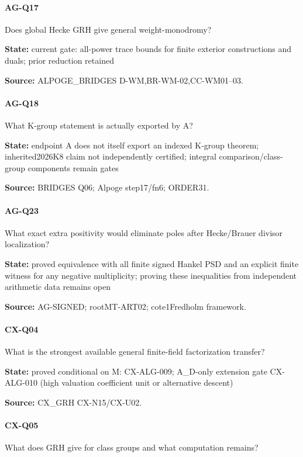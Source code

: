 \documentclass[11pt,a4paper]{article}
\begin{document}
\paragraph{AG-Q17} Does global Hecke GRH give general weight-monodromy?

\textbf{State:} current gate:\allowbreak{} all-power trace bounds for finite exterior constructions and duals; prior reduction retained

\textbf{Source:} ALPOGE\_\allowbreak{}BRIDGES D-WM,BR-WM-02,CC-WM01–\allowbreak{}03.

\paragraph{AG-Q18} What K-group statement is actually exported by A?

\textbf{State:} endpoint A does not itself export an indexed K-group theorem; inherited2026K8 claim not independently certified; integral comparison/\allowbreak{}class-group components remain gates

\textbf{Source:} BRIDGES Q06; Alpoge step17/\allowbreak{}fn6; ORDER31.

\paragraph{AG-Q23} What exact extra positivity would eliminate poles after Hecke/\allowbreak{}Brauer divisor localization?

\textbf{State:} proved equivalence with all finite signed Hankel PSD and an explicit finite witness for any negative multiplicity; proving these inequalities from independent arithmetic data remains open

\textbf{Source:} AG-SIGNED; rootMT-ART02; cote1Fredholm framework.

\paragraph{CX-Q04} What is the strongest available general finite-field factorization transfer?

\textbf{State:} proved conditional on M:\allowbreak{} CX-ALG-009; A\_\allowbreak{}D-only extension gate CX-ALG-010 (high valuation coefficient unit or alternative descent)

\textbf{Source:} CX\_\allowbreak{}GRH CX-N15/\allowbreak{}CX-U02.

\paragraph{CX-Q05} What does GRH give for class groups and what computation remains?
\end{document}
